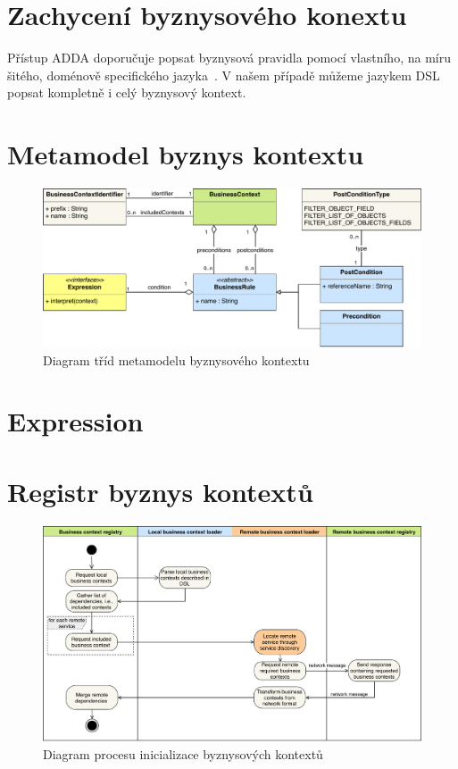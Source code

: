 \section{Zachycení byznysového konextu}

Přístup ADDA doporučuje popsat byznysová pravidla pomocí
vlastního, na míru šitého, doménově specifického jazyka~\cite{cemus2015automated}.
V našem případě můžeme jazykem DSL popsat kompletně i celý
byznysový kontext.

\section{Metamodel byznys kontextu}\label{sec:metamodel}

\begin{figure}
    \centering
    \includegraphics[keepaspectratio=true, width=\linewidth]{figures/business-context-metamodel.pdf}
    \caption{Diagram tříd metamodelu byznysového kontextu}
    \label{fig:business-context-metamodel}
\end{figure} %

\section{Expression}

\section{Registr byznys kontextů}

\begin{figure}
    \centering
    \includegraphics[keepaspectratio=true, width=0.8\linewidth]{figures/business-context-loading.pdf}
    \caption{Diagram procesu inicializace byznysových kontextů}
    \label{fig:business-context-loading}
\end{figure} %

